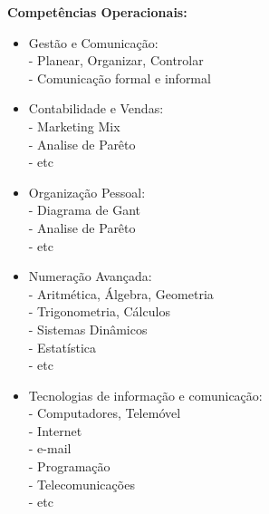 \begin{minipage}[t]{.5\linewidth}
\qquad \textbf{Competências Operacionais:}
\begin{itemize}
\setlength\itemsep{-0.8em}
\item Gestão e Comunicação:\\
- Planear, Organizar, Controlar\\
- Comunicação formal e informal\\
\item Contabilidade e Vendas:\\
- Marketing Mix\\
- Analise de Parêto\\
- etc\\
\item Organização Pessoal:\\
- Diagrama de Gant\\
- Analise de Parêto\\
- etc\\
\item Numeração Avançada:\\
- Aritmética, Álgebra, Geometria\\
- Trigonometria, Cálculos\\
- Sistemas Dinâmicos\\
- Estatística\\
- etc\\
\item Tecnologias de informação e comunicação:\\
- Computadores, Telemóvel\\
- Internet\\
- e-mail\\
- Programação\\
- Telecomunicações\\
- etc\\
\end{itemize}
\end{minipage}
